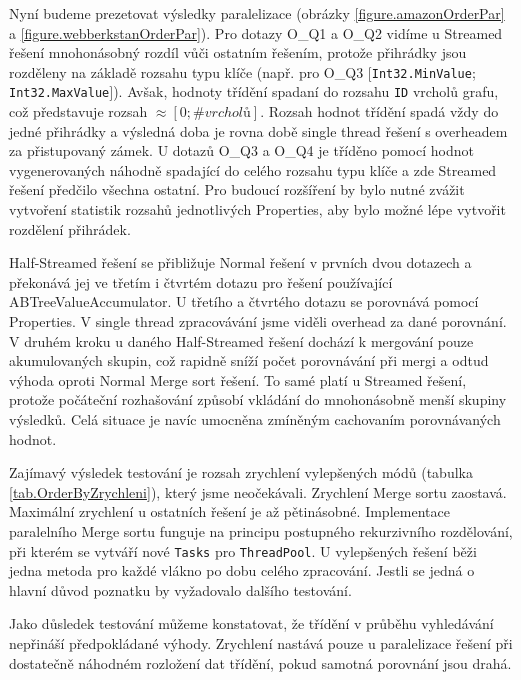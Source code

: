Nyní budeme prezetovat výsledky paralelizace (obrázky \ref{figure.amazonOrderPar} a \ref{figure.webberkstanOrderPar}).
Pro dotazy O\_Q1 a O\_Q2 vidíme u Streamed řešení mnohonásobný rozdíl vůči ostatním řešením, protože přihrádky jsou rozděleny na základě rozsahu typu klíče (např. pro O\_Q3 $[$\verb+Int32.MinValue+; \verb+Int32.MaxValue+$]$).
Avšak, hodnoty třídění spadaní do rozsahu \verb+ID+ vrcholů grafu, což představuje rozsah $\approx [0; \#vrcholů]$. 
Rozsah hodnot třídění spadá vždy do jedné přihrádky a výsledná doba je rovna době single thread řešení s overheadem za přistupovaný zámek.
U dotazů O\_Q3 a O\_Q4 je tříděno pomocí hodnot vygenerovaných náhodně spadající do celého rozsahu typu klíče a zde Streamed řešení předčilo všechna ostatní. 
Pro budoucí rozšíření by bylo nutné zvážit vytvoření statistik rozsahů jednotlivých Properties, aby bylo možné lépe vytvořit rozdělení přihrádek.

Half-Streamed řešení se přibližuje Normal řešení v prvních dvou dotazech a překonává jej ve třetím i čtvrtém dotazu pro řešení používající ABTreeValueAccumulator.
U třetího a čtvrtého dotazu se porovnává pomocí Properties. V single thread zpracovávání jsme viděli overhead za dané porovnání.
V druhém kroku u daného Half-Streamed řešení dochází k mergování pouze akumulovaných skupin, což rapidně sníží počet porovnávání při mergi a odtud výhoda oproti Normal Merge sort řešení. 
To samé platí u Streamed řešení, protože počáteční rozhašování způsobí vkládání do mnohonásobně menší skupiny výsledků. 
Celá situace je navíc umocněna zmíněným cachovaním porovnávaných hodnot. 

Zajímavý výsledek testování je rozsah zrychlení vylepšených módů (tabulka \ref{tab.OrderByZrychleni}), který jsme neočekávali. 
Zrychlení Merge sortu zaostavá. Maximální zrychlení u ostatních řešení je až pětinásobné. 
Implementace paralelního Merge sortu funguje na principu postupného rekurzivního rozdělování, při kterém se vytváří nové \verb+Tasks+ pro \verb+ThreadPool+.
U vylepšených řešení běži jedna metoda pro každé vlákno po dobu celého zpracování. Jestli se jedná o hlavní důvod poznatku by vyžadovalo dalšího testování. 

Jako důsledek testování můžeme konstatovat, že třídění v průběhu vyhledávání nepřináší předpokládané výhody.
Zrychlení nastává pouze u paralelizace řešení při dostatečně náhodném rozložení dat třídění, pokud samotná porovnání jsou drahá.


